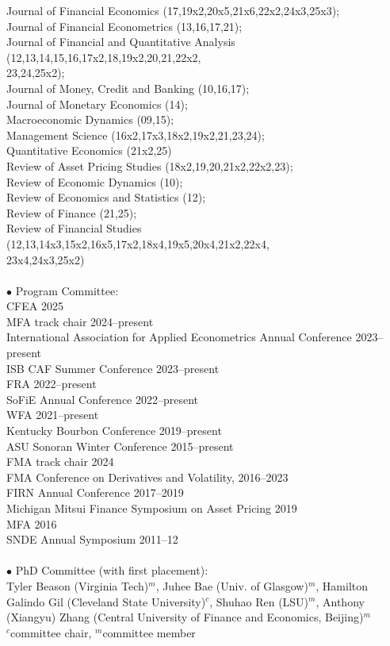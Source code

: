 \documentclass[margin,line,12pt]{res}
\begin{document}
\begin{resume}
Journal of Financial Economics (17,19x2,20x5,21x6,22x2,24x3,25x3);\\
Journal of Financial Econometrics (13,16,17,21);\\
Journal of Financial and Quantitative Analysis (12,13,14,15,16,17x2,18,19x2,20,21,22x2,\\\phantom{Referee}23,24,25x2);\\
Journal of Money, Credit and Banking (10,16,17);\\
Journal of Monetary Economics (14);\\
Macroeconomic Dynamics (09,15);\\
Management Science (16x2,17x3,18x2,19x2,21,23,24);\\
Quantitative Economics (21x2,25)\\
Review of Asset Pricing Studies (18x2,19,20,21x2,22x2,23);\\
Review of Economic Dynamics (10);\\
Review of Economics and Statistics (12);\\
Review of Finance (21,25);\\
Review of Financial Studies (12,13,14x3,15x2,16x5,17x2,18x4,19x5,20x4,21x2,22x4,\\\phantom{Referee}23x4,24x3,25x2)\\
\\
$\bullet$ Program Committee:\\
CFEA 2025\\
MFA track chair 2024--present\\
International Association for Applied Econometrics Annual Conference 2023--present\\
ISB CAF Summer Conference 2023--present\\
FRA 2022--present\\
SoFiE Annual Conference 2022--present\\
WFA 2021--present\\
Kentucky Bourbon Conference 2019--present\\
ASU Sonoran Winter Conference 2015--present\\
FMA track chair 2024\\
FMA Conference on Derivatives and Volatility, 2016--2023\\
FIRN Annual Conference 2017--2019\\
Michigan Mitsui Finance Symposium on Asset Pricing 2019\\
MFA 2016\\
SNDE Annual Symposium 2011--12\\
\\
$\bullet$ PhD Committee (with first placement):\\
Tyler Beason (Virginia Tech)$^m$, Juhee Bae (Univ. of Glasgow)$^m$, Hamilton Galindo Gil (Cleveland State University)$^c$, Shuhao Ren (LSU)$^m$, Anthony (Xiangyu) Zhang (Central University of Finance and Economics, Beijing)$^m$\\
{\footnotesize $^c$committee chair, $^m$committee member} 


\end{resume}
\end{document}

